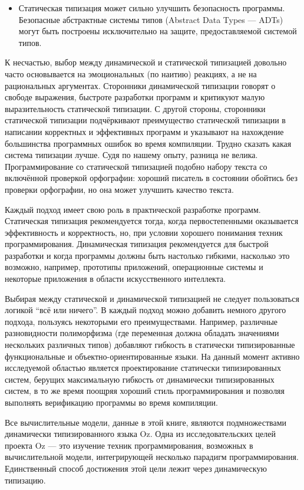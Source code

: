 \begin{itemize}
\item{Статическая типизация может сильно улучшить безопасность программы. Безопасные абстрактные системы типов (Abstract Data Types --- ADTs) могут быть построены исключительно на защите, предоставляемой системой типов.}
\end{itemize}

К несчастью, выбор между динамической и статической типизацией довольно часто основывается на эмоциональных (по наитию) реакциях, а не на рациональных аргументах. Сторонники динамической типизации говорят о свободе выражения, быстроте разработки программ и критикуют малую выразительность статической типизации. С другой стороны, сторонники статической типизации подчёркивают преимущество статической типизации в написании корректных и эффективных программ и указывают на нахождение большинства программных ошибок во время компиляции. Трудно сказать какая система типизации лучше. Судя по нашему опыту, разница не велика. Программирование со статической типизацией подобно набору текста со включённой проверкой орфографии: хороший писатель в состоянии обойтись без проверки орфографии, но она может улучшить качество текста.

Каждый подход имеет свою роль в практической разработке программ. Статическая типизация рекомендуется тогда, когда первостепенными оказывается эффективность и корректность, но, при условии хорошего понимания техник программирования. Динамическая типизация рекомендуется для быстрой разработки и когда программы должны быть настолько гибкими, насколько это возможно, например, прототипы приложений, операционные системы и некоторые приложения в области искусственного интеллекта.

Выбирая между статической и динамической типизацией не следует пользоваться логикой ``всё или ничего''. В каждый подход можно добавить немного другого подхода, пользуясь некоторыми его преимуществами. Например, различные разновидности полиморфизма (где переменная должна обладать значениями нескольких различных типов) добавляют гибкость в статически типизированные функциональные и объект\-но-ориентированные языки. На данный момент активно исследуемой областью является проектирование статически типизированных систем, берущих максимальную гибкость от динамически типизированных систем, в то же время поощряя хороший стиль программирования и позволяя выполнять верификацию программы во время компиляции.

Все вычислительные модели, данные в этой книге, являются подмножествами динамически типизированного языка Oz. Одна из исследовательских целей проекта Oz --- это изучение техник программирования, возможных в вычислительной модели, интегрирующей несколько парадигм программирования. Единственный способ достижения этой цели лежит через динамическую типизацию.

